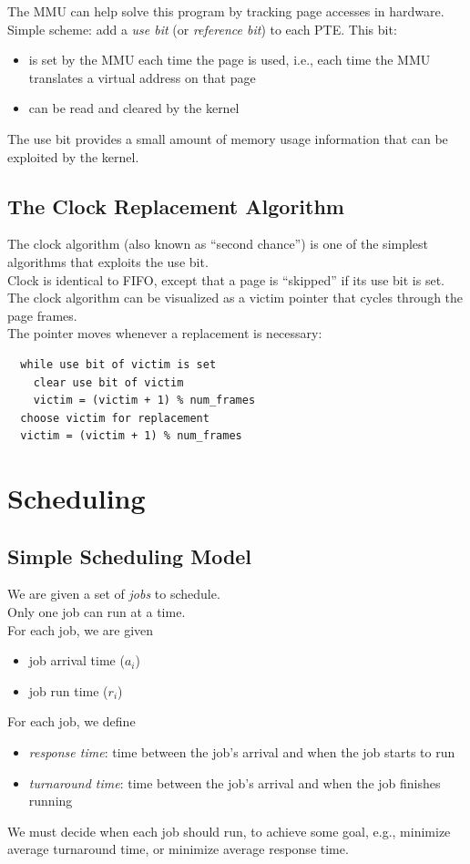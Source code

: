 \documentclass[12pt]{article}
\theoremstyle{plain}
\theoremstyle{definition}
\begin{document}
The MMU can help solve this program by tracking page accesses in hardware. \\
Simple scheme: add a \emph{use bit} (or \emph{reference bit}) to each PTE.
This bit:
\begin{itemize}
  \item is set by the MMU each time the page is used, i.e., each time the MMU translates a virtual address on that page
  \item can be read and cleared by the kernel
\end{itemize}

The use bit provides a small amount of memory usage information that can be exploited by the kernel.

\subsection{The Clock Replacement Algorithm}
The clock algorithm (also known as ``second chance'') is one of the simplest algorithms that exploits the use bit. \\

Clock is identical to FIFO, except that a page is ``skipped'' if its use bit is set. \\

The clock algorithm can be visualized as a victim pointer that cycles through the page frames. \\
The pointer moves whenever a replacement is necessary:
\begin{verbatim}
  while use bit of victim is set
    clear use bit of victim
    victim = (victim + 1) % num_frames
  choose victim for replacement
  victim = (victim + 1) % num_frames
\end{verbatim}


\newpage
\section{Scheduling}
\subsection{Simple Scheduling Model}
We are given a set of \emph{jobs} to schedule. \\
Only one job can run at a time. \\
For each job, we are given
\begin{itemize}
  \item job arrival time ($a_{i}$)
  \item job run time ($r_{i}$)
\end{itemize}
For each job, we define
\begin{itemize}
  \item \emph{response time}: time between the job's arrival and when the job starts to run
  \item \emph{turnaround time}: time between the job's arrival and when the job finishes running
\end{itemize}
We must decide when each job should run, to achieve some goal, e.g., minimize average turnaround time, or minimize average response time.
\end{document}
